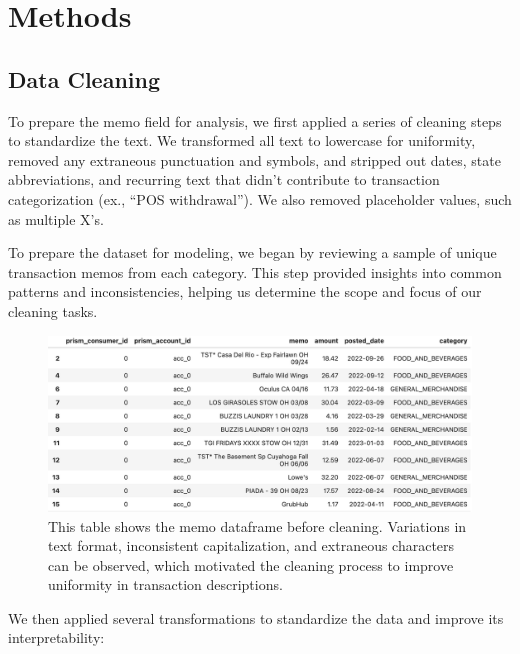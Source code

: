 \documentclass[12pt,letterpaper]{article}
\begin{document}
\section{Methods}
\subsection{Data Cleaning}
To prepare the memo field for analysis, we first applied a series of cleaning steps to standardize the text. We transformed all text to lowercase for uniformity, removed any extraneous punctuation and symbols, and stripped out dates, state abbreviations, and recurring text that didn’t contribute to transaction categorization (ex., “POS withdrawal”). We also removed placeholder values, such as multiple X’s.

To prepare the dataset for modeling, we began by reviewing a sample of unique transaction memos from each category. This step provided insights into common patterns and inconsistencies, helping us determine the scope and focus of our cleaning tasks.

\begin{figure}[H]
    \centering
    \includegraphics[width=\textwidth]{figure/nonclean_df.png}
    \caption{This table shows the memo dataframe before cleaning. Variations in text format, inconsistent capitalization, and extraneous characters can be observed, which motivated the cleaning process to improve uniformity in transaction descriptions.}
    \label{fig:pre_cleaned_memo}
\end{figure}

We then applied several transformations to standardize the data and improve its interpretability:
\end{document}
